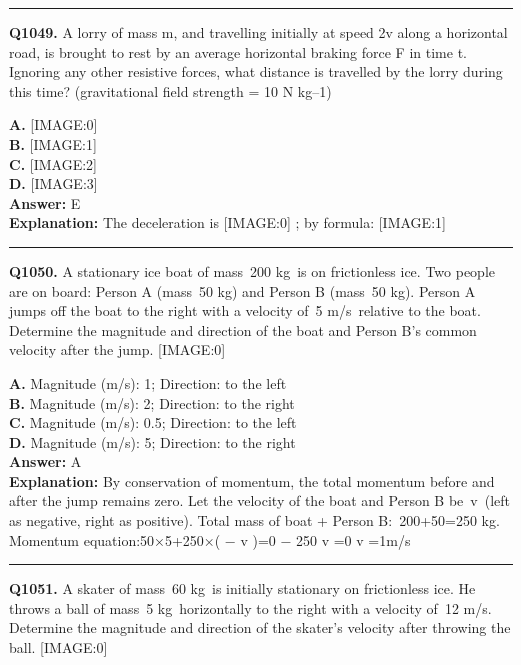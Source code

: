 \documentclass[12pt]{article}
\begin{document}
\hrule
\vspace{1em}


\noindent
\textbf{Q1049.} A lorry of mass m, and travelling initially at speed 2v along a horizontal road, is brought to rest by an average horizontal braking force F in time t. Ignoring any other resistive forces, what distance is travelled by the lorry during this time? (gravitational field strength = 10 N kg–1)



\textbf{A.} [IMAGE:0] \\
\textbf{B.} [IMAGE:1] \\
\textbf{C.} [IMAGE:2] \\
\textbf{D.} [IMAGE:3] \\

\textbf{Answer:} E \\
\textbf{Explanation:} The deceleration is
[IMAGE:0]
; by formula:
[IMAGE:1]

\hrule
\vspace{1em}


\noindent
\textbf{Q1050.} A stationary ice boat of mass 200
kg is on frictionless ice. Two people are on board: Person A (mass 50
kg) and Person B (mass 50
kg). Person A jumps off the boat to the right with a velocity of 5
m/s relative to the boat. Determine the magnitude and direction of the boat and Person B’s common velocity after the jump.
[IMAGE:0]



\textbf{A.} Magnitude (m/s): 1; Direction: to the left \\
\textbf{B.} Magnitude (m/s): 2; Direction: to the right \\
\textbf{C.} Magnitude (m/s): 0.5; Direction: to the left \\
\textbf{D.} Magnitude (m/s): 5; Direction: to the right \\

\textbf{Answer:} A \\
\textbf{Explanation:} By conservation of momentum, the total momentum before and after the jump remains zero. Let the velocity of the boat and Person B be v (left as negative, right as positive).
Total mass of boat + Person B: 200+50=250
kg.
Momentum equation:50×5+250×(
−
v
)=0
−
250
v
=0
\implies 
v
=1m/s

\hrule
\vspace{1em}


\noindent
\textbf{Q1051.} A skater of mass 60
kg is initially stationary on frictionless ice. He throws a ball of mass 5
kg horizontally to the right with a velocity of 12
m/s. Determine the magnitude and direction of the skater’s velocity after throwing the ball.
[IMAGE:0]
\end{document}
